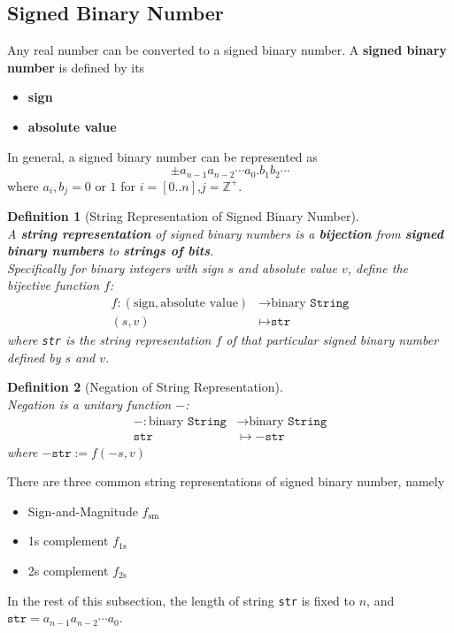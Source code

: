 \documentclass[12pt]{article}
\newtheorem{definition}{Definition}[section]
\theoremstyle{definition}
\begin{document}
\subsection{Signed Binary Number}
Any real number can be converted to a signed binary number. A \textbf{signed binary number} is defined by its
\begin{itemize}
\item \textbf{sign}
\item \textbf{absolute value}
\end{itemize}
In general, a signed binary number can be represented as \[
\pm a_{n-1}a_{n-2}\cdots a_0.b_1b_2\cdots\] where $a_i, b_j = 0\text{ or }1$ for $i = [0..n]$,\;\;\;$j=\mathbb{Z}^+$.   
\begin{definition}[String Representation of Signed Binary Number]
\hfill\\\normalfont A \textbf{string representation} of signed binary numbers is a \textbf{bijection} from \textbf{signed binary numbers} to \textbf{strings of bits}.\\
Specifically for binary integers with sign $s$ and absolute value $v$, define the bijective function $f$:
\begin{align*}
f:(\text{sign},\text{absolute value})&\to \text{binary }\texttt{String}\\
(s,v)&\mapsto \texttt{str}
\end{align*}
where \texttt{str} is the string representation $f$ of that particular signed binary number defined by $s$ and $v$.
\end{definition}
\begin{definition}[Negation of String Representation]
\hfill\\\normalfont 
Negation is a unitary function $-$:
\begin{align*}
-:\text{binary }\texttt{String}&\to \text{binary }\texttt{String}\\
\texttt{str}&\mapsto -\texttt{str}
\end{align*}
where $
-\texttt{str}:=f(-s,v)
$
\end{definition}
There are three common string representations of signed binary number, namely
\begin{itemize}
  \item Sign-and-Magnitude $f_\text{sm}$
  \item 1s complement $f_{1\text{s}}$
  \item 2s complement $f_{2\text{s}}$
\end{itemize}
In the rest of this subsection, the length of string \texttt{str} is fixed to $n$, and $\texttt{str} = a_{n-1}a_{n-2}\cdots a_0$.
\end{document}
